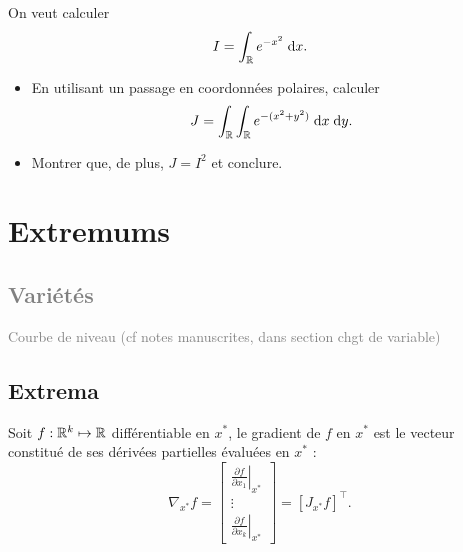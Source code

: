 \begin{exercise*}
  On veut calculer 
  $$
  I = \int_{\mathbb{R}} e^{-x^2} \; \text{d} x.
  $$
  \begin{itemize}
    \item En utilisant un passage en coordonnées polaires, calculer
    $$
    J = \int_{\mathbb{R}} \int_{\mathbb{R}} e^{-(x^2+y^2)} \; \text{d} x \; \text{d} y.
    $$
    \item Montrer que, de plus, $J = I^2$ et conclure.
  \end{itemize}
\end{exercise*}

\section{Extremums}

\subsection{\textcolor{gray}{Variétés}}

\textcolor{gray}{Courbe de niveau (cf notes manuscrites, dans section chgt de variable)}

\subsection{Extrema}

\begin{definition*}[Gradient]
  Soit $f : \mathbb{R}^k \mapsto \mathbb{R}$ différentiable en $x^*$, le gradient de $f$ en $x^*$ est le vecteur constitué de ses dérivées partielles évaluées en $x^*$ : 
  $$
  \nabla_{x^*}f 
  = \left[\begin{array}{c}
              \displaystyle{\left.\frac{\partial f}{\partial x_1}\right|_{x^*}}  \\
              \vdots \\
              \displaystyle{\left.\frac{\partial f}{\partial x_k}\right|_{x^*}} 
             \end{array}\right]
  = \left[J_{x^*} f\right]^\top.
  $$
\end{definition*}

